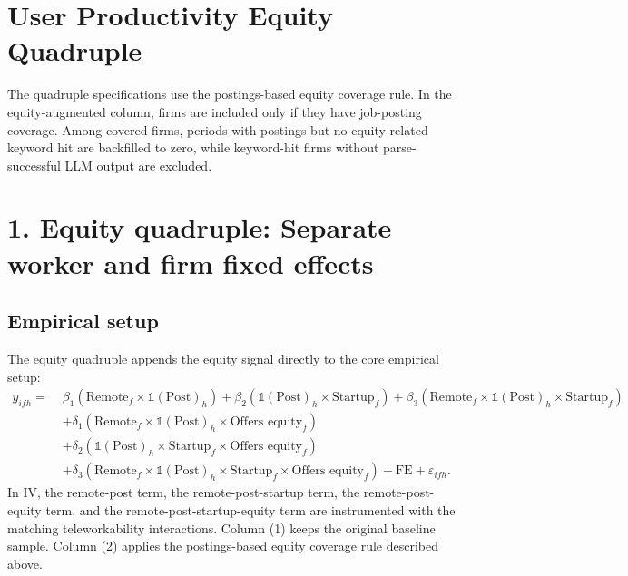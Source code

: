 \documentclass{article}
\begin{document}
\section*{User Productivity Equity Quadruple}

\noindent The quadruple specifications use the postings-based equity coverage rule. In the equity-augmented column, firms are included only if they have job-posting coverage. Among covered firms, periods with postings but no equity-related keyword hit are backfilled to zero, while keyword-hit firms without parse-successful LLM output are excluded.

\section*{1. Equity quadruple: Separate worker and firm fixed effects}

\subsection*{Empirical setup}
\noindent The equity quadruple appends the equity signal directly to the core empirical setup:
\[
  \begin{aligned}
    y_{ifh} =\; & \beta_1 \left( \text{Remote}_f \times \mathds{1}(\text{Post})_h \right)
    + \beta_2 \left( \mathds{1}(\text{Post})_h \times \text{Startup}_f \right)
    + \beta_3 \left( \text{Remote}_f \times \mathds{1}(\text{Post})_h \times \text{Startup}_f \right) \\
    & + \delta_1 \left( \text{Remote}_f \times \mathds{1}(\text{Post})_h \times \text{Offers equity}_f \right) \\
    & + \delta_2 \left( \mathds{1}(\text{Post})_h \times \text{Startup}_f \times \text{Offers equity}_f \right) \\
    & + \delta_3 \left( \text{Remote}_f \times \mathds{1}(\text{Post})_h \times \text{Startup}_f \times \text{Offers equity}_f \right)
    + \text{FE} + \varepsilon_{ifh} .
  \end{aligned}
\]
\noindent In IV, the remote-post term, the remote-post-startup term, the remote-post-equity term, and the remote-post-startup-equity term are instrumented with the matching teleworkability interactions. Column (1) keeps the original baseline sample. Column (2) applies the postings-based equity coverage rule described above.
\end{document}
